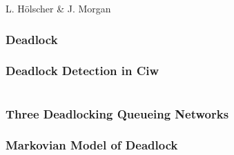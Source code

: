 \documentclass[xcolor={table}]{beamer}
\begin{document}
\begin{frame}
\begin{center}
L. H\"{o}lscher \& J. Morgan
\begin{figure}

\end{figure}
\end{center}
\end{frame}

\begin{frame}
    \frametitle{Deadlock}
    \begin{figure}
    
    \end{figure}
\end{frame}

\begin{frame}
    \begin{figure}
    
    \end{figure}
\end{frame}

\begin{frame}
\frametitle{Deadlock Detection in Ciw}
\begin{center}
\fontsize{8.5pt}{10pt} \inputminted{python}{deadlockciw.py}
\end{center}
\end{frame}

\begin{frame}
\frametitle{Three Deadlocking Queueing Networks}
\begin{figure}

\end{figure}
\end{frame}

\begin{frame}
    \frametitle{Markovian Model of Deadlock}
    \newline
\end{frame}
\end{document}
